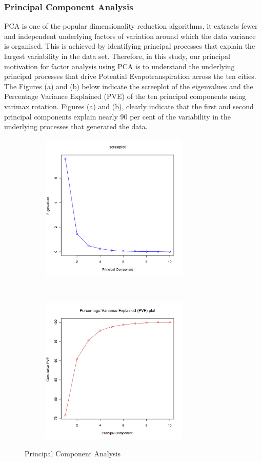 \documentclass[12pt,a4paper]{article}
\begin{document}
\subsubsection{Principal Component Analysis}
PCA is one of the popular dimensionality reduction algorithms,  it extracts fewer and independent underlying factors of variation around which the data variance is organised.  This is achieved by identifying principal processes that explain the largest variability in the data set. 
Therefore, in this study, our principal motivation for factor analysis using PCA is to understand the underlying principal processes that drive Potential Evapotranspiration across the ten cities. The Figures (a) and (b) below indicate the screeplot of the eigenvalues and the Percentage Variance Explained (PVE) of the ten principal components using varimax rotation.
Figures (a) and (b),  clearly indicate that the first and second principal components explain nearly 90 per cent of the variability in  the underlying processes that generated the data.
\begin{figure}[!h]
    \centering
    \begin{subfigure}[t]{0.5\textwidth}
        \centering
        \includegraphics[width=\textwidth,height=200pt]{./gaphics/q002_b.png}
        \caption{}
    \end{subfigure}%
    ~ 
    \begin{subfigure}[t]{0.5\textwidth}
        \centering
        \includegraphics[width=\textwidth,height=200pt]{./gaphics/q002_c.png}
        \caption{}
    \end{subfigure}
    \caption{Principal Component Analysis}
\end{figure}
\end{document}
